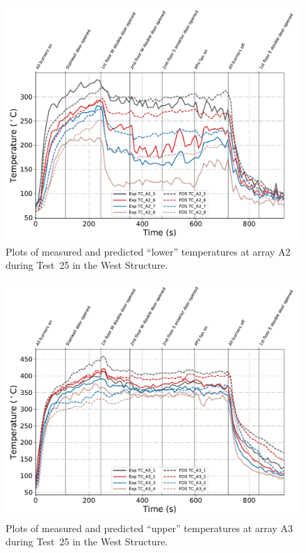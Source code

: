 \begin{figure}[!h]
	\centering
	\includegraphics[width=\columnwidth]{Figures/Plots/Validation/Temperature/Test_25_TC_A2_lower}
	\caption{Plots of measured and predicted ``lower'' temperatures at array A2 during Test~25 in the West Structure.}
	\label{fig:TCA2_lower_data_Test25}
\end{figure}

\begin{figure}[!h]
	\centering
	\includegraphics[width=\columnwidth]{Figures/Plots/Validation/Temperature/Test_25_TC_A3_upper}
	\caption{Plots of measured and predicted ``upper'' temperatures at array A3 during Test~25 in the West Structure.}
	\label{fig:TCA3_upper_data_Test25}
\end{figure}

